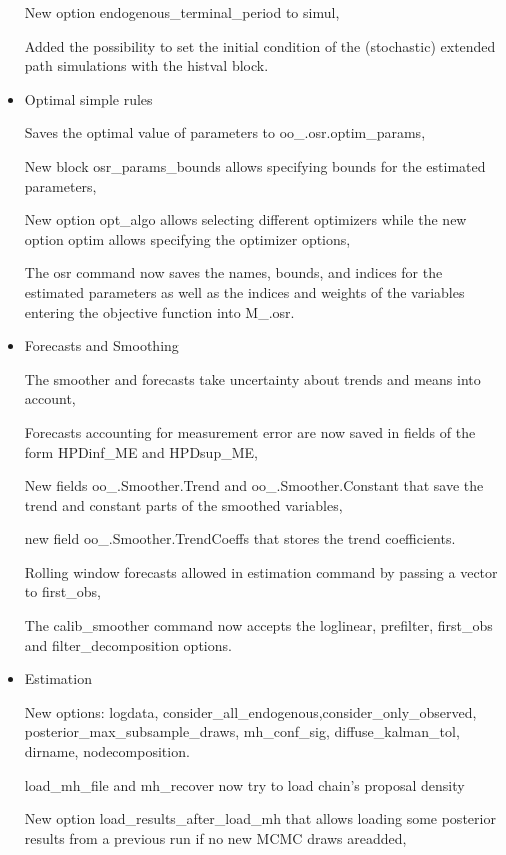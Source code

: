 \documentclass[10pt,math=newtx,citestyle=gb7714-2015,bibstyle=gb7714-2015]{elegantbook}
\begin{document}
\begin{itemize}
		
		New option endogenous\_terminal\_period to simul,
		
		
		Added the possibility to set the initial condition of the (stochastic) extended path simulations with the histval block.
		
		\item Optimal simple rules
		
		
		Saves the optimal value of parameters to oo\_.osr.optim\_params,
		
		
		New block osr\_params\_bounds allows specifying bounds for the estimated parameters,
		
		
		New option opt\_algo allows selecting different optimizers while the new option optim allows specifying the optimizer options,
		
		
		The osr command now saves the names, bounds, and indices for the estimated parameters as well as the indices and weights of the variables entering the objective function into M\_.osr.
		
		\item Forecasts and Smoothing
		
		
		The smoother and forecasts take uncertainty about trends and means into account,
		
		
		Forecasts accounting for measurement error are now saved in fields of the form HPDinf\_ME and HPDsup\_ME,
		
		
		New fields oo\_.Smoother.Trend and oo\_.Smoother.Constant that save the trend and constant parts of the smoothed variables,
		
		
		new field oo\_.Smoother.TrendCoeffs that stores the trend coefficients.
		
		
		Rolling window forecasts allowed in estimation command by passing a vector to first\_obs,
		
		
		The calib\_smoother command now accepts the loglinear, prefilter, first\_obs and filter\_decomposition options.
		\item Estimation
		
		
		New options: logdata, consider\_all\_endogenous,consider\_only\_observed, posterior\_max\_subsample\_draws, mh\_conf\_sig, diffuse\_kalman\_tol, dirname, nodecomposition.
		
		
		load\_mh\_file and mh\_recover now try to load chain's proposal density\,
		
		
		New option load\_results\_after\_load\_mh that allows loading some posterior results from a previous run if no new MCMC draws areadded,
		

\end{itemize}
\end{document}
